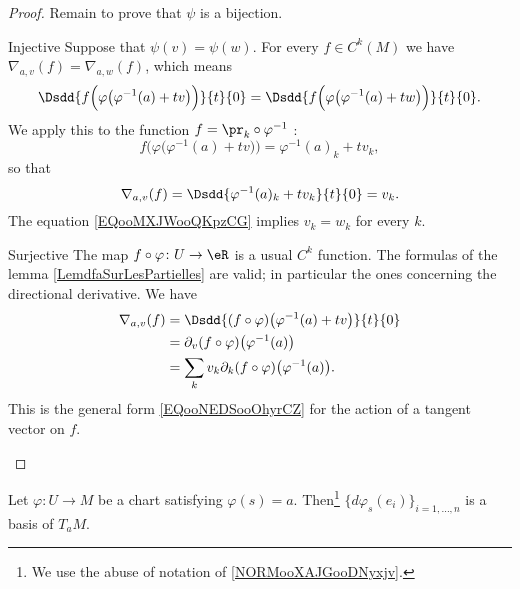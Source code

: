 \begin{proof}
    Remain to prove that \( \psi\) is a bijection.
    \begin{subproof}
        \item[Injective]
            Suppose that \( \psi(v)=\psi(w)\). For every \( f\in C^k(M)\) we have \( \nabla_{a,v}(f)=\nabla_{a,w}(f)\), which means
            \begin{equation}        \label{EQooMXJWooQKpzCG}
                \Dsdd{ f\Big( \varphi\big( \varphi^{-1}(a)+tv \big) \Big) }{t}{0}=\Dsdd{ f\Big( \varphi\big( \varphi^{-1}(a)+tw \big) \Big) }{t}{0}.
            \end{equation}
            We apply this to the function \( f=\pr_k\circ\varphi^{-1}\) :
            \begin{equation}
                f\Big( \varphi\big( \varphi^{-1}(a)+tv \big) \Big)=\varphi^{-1}(a)_k+tv_k,
            \end{equation}
            so that
            \begin{equation}
                \nabla_{a,v}(f)=\Dsdd{ \varphi^{-1}(a)_k+tv_k }{t}{0}=v_k.
            \end{equation}
            The equation \eqref{EQooMXJWooQKpzCG} implies \( v_k=w_k\) for every \( k\).
        \item[Surjective]
            The map \( f\circ \varphi\colon U \to \eR \) is a usual \( C^k\) function. The formulas of the lemma \ref{LemdfaSurLesPartielles} are valid; in particular the ones concerning the directional derivative. We have
            \begin{subequations}
                \begin{align}
                    \nabla_{a,v}(f)&=\Dsdd{ (f\circ \varphi)\big( \varphi^{-1}(a)+tv \big) }{t}{0}\\
                    &=\partial_v(f\circ \varphi)\big( \varphi^{-1}(a) \big)\\
                    &=\sum_k v_k\partial_k(f\circ\varphi)\big( \varphi^{-1}(a) \big).
                \end{align}
            \end{subequations}
            This is the general form \eqref{EQooNEDSooOhyrCZ} for the action of a tangent vector on \( f\).
    \end{subproof}
\end{proof}

\begin{proposition}
    Let \( \varphi\colon U\to M\) be a chart satisfying \( \varphi(s)=a\). Then\footnote{We use the abuse of notation of \ref{NORMooXAJGooDNyxjv}.} \( \{ d\varphi_s(e_i) \}_{i=1,\ldots, n}\) is a basis of \( T_aM\).
\end{proposition}

